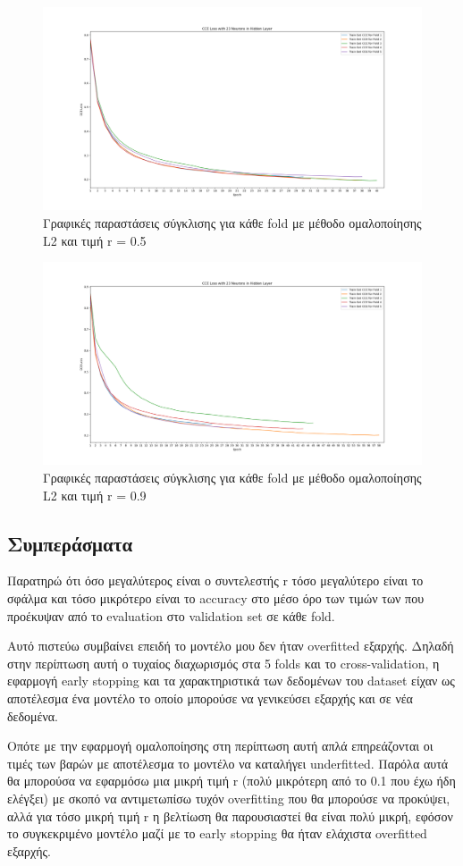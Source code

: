 \documentclass[12pt,a4paper]{article}
\begin{document}
\begin{figure}[H]
	\includegraphics[width=\textwidth]{29. L2 with r = 0.5.png}
	\caption{Γραφικές παραστάσεις σύγκλισης για κάθε fold με μέθοδο ομαλοποίησης L2 και τιμή r = 0.5}
\end{figure}

\begin{figure}[H]
	\includegraphics[width=\textwidth]{30. L2 with r = 0.9.png}
	\caption{Γραφικές παραστάσεις σύγκλισης για κάθε fold με μέθοδο ομαλοποίησης L2 και τιμή r = 0.9}
\end{figure}

\subsection{Συμπεράσματα}

Παρατηρώ ότι όσο μεγαλύτερος είναι ο συντελεστής r τόσο μεγαλύτερο είναι το σφάλμα και τόσο μικρότερο είναι το accuracy στο μέσο όρο των τιμών των που προέκυψαν από το evaluation στο validation set σε κάθε fold. 

Αυτό πιστεύω συμβαίνει επειδή το μοντέλο μου δεν ήταν overfitted εξαρχής. Δηλαδή στην περίπτωση αυτή ο τυχαίος διαχωρισμός στα 5 folds και το cross-validation, η εφαρμογή early stopping και τα χαρακτηριστικά των δεδομένων του dataset είχαν ως αποτέλεσμα ένα μοντέλο το οποίο μπορούσε να γενικεύσει εξαρχής και σε νέα δεδομένα.

Οπότε με την εφαρμογή ομαλοποίησης στη περίπτωση αυτή απλά επηρεάζονται οι τιμές των βαρών με αποτέλεσμα το μοντέλο να καταλήγει underfitted. Παρόλα αυτά θα μπορούσα να εφαρμόσω μια μικρή τιμή r (πολύ μικρότερη από το 0.1 που έχω ήδη ελέγξει) με σκοπό να αντιμετωπίσω τυχόν overfitting που θα μπορούσε να προκύψει, αλλά για τόσο μικρή τιμή r η βελτίωση θα παρουσιαστεί θα είναι πολύ μικρή, εφόσον το συγκεκριμένο μοντέλο μαζί με το early stopping θα ήταν ελάχιστα overfitted εξαρχής.
\end{document}

